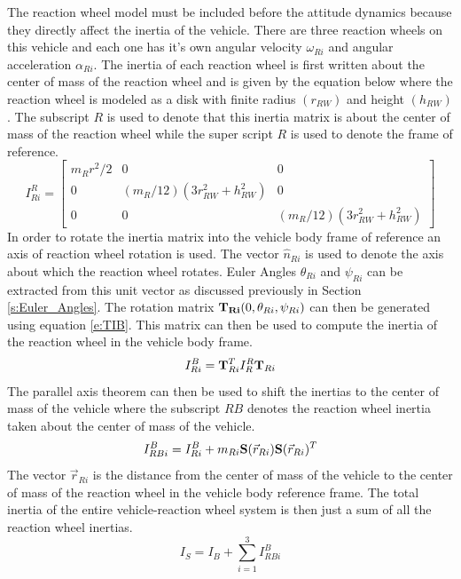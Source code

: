 \documentclass{article}
\begin{document}
The reaction wheel model must be included before the attitude dynamics
because they directly affect the inertia of the vehicle. There are
three reaction wheels on this vehicle and each one has it's own
angular velocity $\omega_{Ri}$ and angular acceleration
$\alpha_{Ri}$. The inertia of each reaction wheel is first written
about the center of mass of the reaction wheel and is given by the
equation below where the reaction wheel is modeled as a disk with
finite radius $(r_{RW})$ and height $(h_{RW})$. The subscript $R$ is used to
denote that this inertia matrix is about the center of mass of the
reaction wheel while the super script $R$ is used to denote the frame
of reference. 
\begin{equation}
  I^{R}_{Ri} = \begin{bmatrix} m_{R}r^2/2 & 0 & 0 \\ 0 & (m_R/12)(3r_{RW}^2+h_{RW}^2) &
    0 \\ 0 & 0 & (m_R/12)(3r_{RW}^2+h_{RW}^2) \end{bmatrix}
\end{equation}
In order to rotate the inertia matrix into the vehicle body frame of
reference an axis of reaction wheel rotation is used. The vector
$\hat{n}_{Ri}$ is used to denote the axis about which the reaction
wheel rotates. Euler Angles $\theta_{Ri}$ and $\psi_{Ri}$ can be
extracted from this unit vector as discussed previously in Section \ref{s:Euler_Angles}. The rotation
matrix ${\bf T_{Ri}}(0,\theta_{Ri},\psi_{Ri})$ can then be 
generated using equation \ref{e:TIB}. This matrix can then be used to
compute the inertia of the reaction wheel in the vehicle body frame.
\begin{equation}
  I^{B}_{Ri} = {\bf T}^T_{Ri}I^{R}_R{\bf T}_{Ri}
\end{equation}
The parallel axis theorem can then be used to shift the inertias to
the center of mass of the vehicle where the subscript $RB$ denotes
the reaction wheel inertia taken about the center of mass of the
vehicle. 
\begin{equation}
  I^{B}_{RBi} = I^{B}_{Ri} + m_{Ri}{\bf S}(\vec{r}_{Ri}){\bf
    S}(\vec{r}_{Ri})^T
\end{equation}
The vector $\vec{r}_{Ri}$ is the distance from the center of mass of
the vehicle to the center of mass of the reaction wheel in the
vehicle body reference frame. The total inertia of the entire
vehicle-reaction wheel system is then just a sum of all the reaction wheel inertias.
\begin{equation}
   I_S = I_B + \sum\limits_{i=1}^3 I^{B}_{RBi}
\end{equation}
\end{document}
